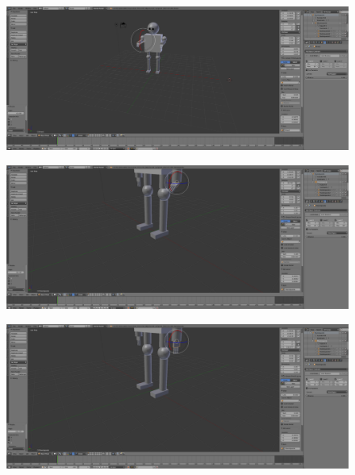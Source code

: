 \documentclass[10pt]{article}
\begin{document}
\begin{figure}[H]
	\begin{center}
	 		\includegraphics[width = 1.00\textwidth]{Imagenes/p2-img9.png}
	\end{center} 
\end{figure}

\begin{figure}[H]
	\begin{center}
	 		\includegraphics[width = 1.00\textwidth]{Imagenes/p2-img10.png}
	\end{center} 
\end{figure}

\begin{figure}[H]
	\begin{center}
	 		\includegraphics[width = 1.00\textwidth]{Imagenes/p2-img11.png}
	\end{center} 
\end{figure}
\end{document}
